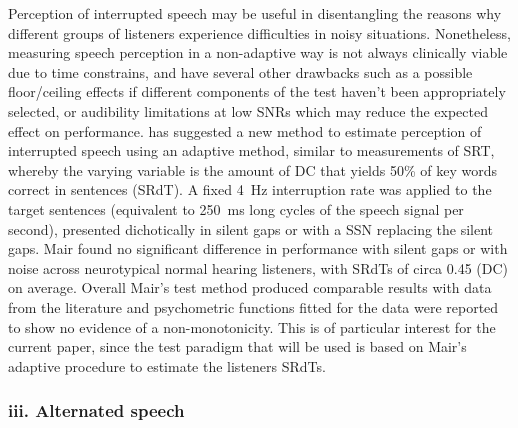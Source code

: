 \documentclass[a4paper, twoside]{templates/ociamthesis}
\begin{document}
Perception of interrupted speech may be useful in disentangling the reasons why different groups of listeners experience difficulties in noisy situations. Nonetheless, measuring speech perception in a non-adaptive way is not always clinically viable due to time constrains, and have several other drawbacks such as a possible floor/ceiling effects if different components of the test haven't been appropriately selected, or audibility limitations at low SNRs which may reduce the expected effect on performance. \textcite{Mair2013} has suggested a new method to estimate perception of interrupted speech using an adaptive method, similar to measurements of SRT, whereby the varying variable is the amount of DC that yields 50\% of key words correct in sentences (SRdT). A fixed 4~Hz interruption rate was applied to the target sentences (equivalent to 250~ms long cycles of the speech signal per second), presented dichotically in silent gaps or with a SSN replacing the silent gaps. Mair found no significant difference in performance with silent gaps or with noise across neurotypical normal hearing listeners, with SRdTs of circa 0.45 (DC) on average. Overall Mair's test method produced comparable results with data from the literature \autocite[cf.~Fig.~6 in][]{Nelson2004} and psychometric functions fitted for the data were reported to show no evidence of a non-monotonicity. This is of particular interest for the current paper, since the test paradigm that will be used is based on Mair's adaptive procedure to estimate the listeners SRdTs.\\

\hypertarget{iii.-alternated-speech}{%
\subsubsection*{iii. Alternated speech}\label{iii.-alternated-speech}}
\end{document}

